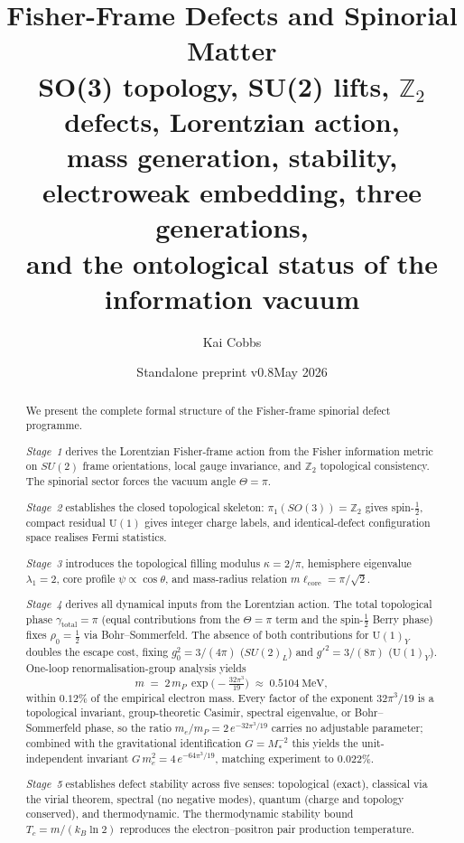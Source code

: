 \documentclass[12pt]{article}
\title{Fisher-Frame Defects and Spinorial Matter\\[6pt]
\large SO(3) topology, SU(2) lifts, $\mathbb{Z}_2$ defects, Lorentzian action,\\
mass generation, stability, electroweak embedding, three generations,\\
and the ontological status of the information vacuum}
\author{Kai Cobbs}
\date{Standalone preprint v0.8\quad May 2026}
\theoremstyle{definition}
\theoremstyle{remark}
\begin{document}
\maketitle

\begin{abstract}
We present the complete formal structure of the Fisher-frame spinorial defect
programme.

\emph{Stage~1} derives the Lorentzian Fisher-frame action from the Fisher
information metric on $SU(2)$ frame orientations, local gauge invariance,
and $\mathbb{Z}_2$ topological consistency.  The spinorial sector forces the
vacuum angle $\Theta=\pi$.

\emph{Stage~2} establishes the closed topological skeleton:
$\pi_1(SO(3))=\mathbb{Z}_2$ gives spin-$\tfrac{1}{2}$, compact residual
$\mathrm{U}(1)$ gives integer charge labels, and identical-defect configuration
space realises Fermi statistics.

\emph{Stage~3} introduces the topological filling modulus $\kappa=2/\pi$,
hemisphere eigenvalue $\lambda_1=2$, core profile $\psi\propto\cos\theta$,
and mass-radius relation $m\ell_{\mathrm{core}}=\pi/\sqrt{2}$.

\emph{Stage~4} derives all dynamical inputs from the Lorentzian action.
The total topological phase $\gamma_{\mathrm{total}}=\pi$ (equal contributions
from the $\Theta=\pi$ term and the spin-$\tfrac{1}{2}$ Berry phase) fixes
$\rho_0=\tfrac{1}{2}$ via Bohr--Sommerfeld.  The absence of both contributions
for $\mathrm{U}(1)_Y$ doubles the escape cost, fixing
$g_0^2=3/(4\pi)$ ($SU(2)_L$) and $g'^2=3/(8\pi)$ ($\mathrm{U}(1)_Y$).
One-loop renormalisation-group analysis yields
\[
  m \;=\; 2\,m_P\,\exp\!\bigl(-\tfrac{32\pi^3}{19}\bigr)
  \;\approx\; 0.5104\ \mathrm{MeV},
\]
within $0.12\%$ of the empirical electron mass.  Every factor of the exponent
$32\pi^3/19$ is a topological invariant, group-theoretic Casimir, spectral
eigenvalue, or Bohr--Sommerfeld phase, so the ratio $m_e/m_P=2\,e^{-32\pi^3/19}$
carries no adjustable parameter; combined with the gravitational identification
$G=M_*^{-2}$ this yields the unit-independent invariant
$G\,m_e^2=4\,e^{-64\pi^3/19}$, matching experiment to $0.022\%$.

\emph{Stage~5} establishes defect stability across five senses: topological
(exact), classical via the virial theorem, spectral (no negative modes),
quantum (charge and topology conserved), and thermodynamic.  The thermodynamic
stability bound $T_c=m/(k_B\ln 2)$ reproduces the electron--positron pair
production temperature.


\end{abstract}
\end{document}
